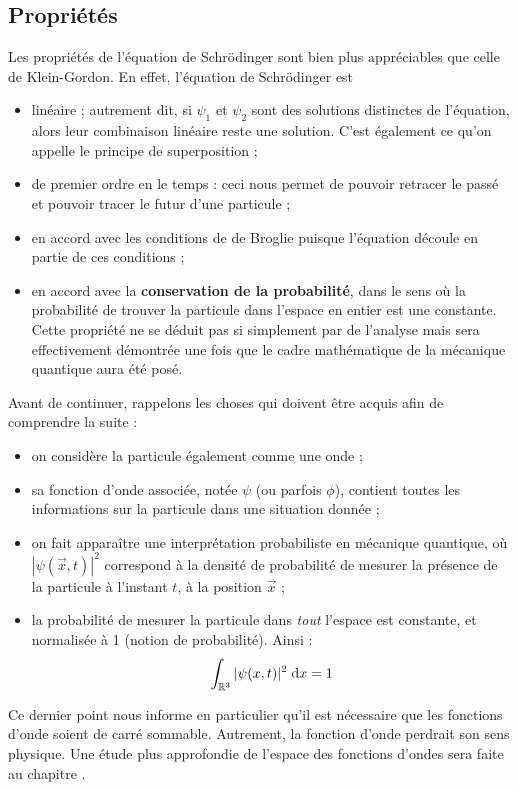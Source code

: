 \documentclass[12pt, a4paper]{book}
\begin{document}
\subsection{Propriétés}
Les propriétés de l'équation de Schrödinger sont bien plus appréciables que celle de Klein-Gordon. En effet, l'équation de Schrödinger est
\begin{itemize}
\item linéaire ; autrement dit, si $\psi_1$ et $\psi_2$ sont des solutions distinctes de l'équation, alors leur combinaison linéaire reste une solution. C'est également ce qu'on appelle le principe de superposition ; 
\item de premier ordre en le temps : ceci nous permet de pouvoir retracer le passé et pouvoir tracer le futur d'une particule {\color{blue}{je comprends pas trop la justification. Et puis pour qlq'un en BA2, est-ce qu'on voit vrmt ce qu'on veut dire par là? Si ça ne tenait qu'à moi, j'enlèverai cette phrase}};
\item en accord avec les conditions de de Broglie puisque l'équation découle en partie de ces conditions ;
\item en accord avec la \textbf{conservation de la probabilité}, dans le sens où la probabilité de trouver la particule dans l'espace en entier est une constante. Cette propriété ne se déduit pas si simplement par de l'analyse mais sera effectivement démontrée une fois que le cadre mathématique de la mécanique quantique aura été posé.
\end{itemize}
Avant de continuer, rappelons les choses qui doivent être acquis afin de comprendre la suite : 
\begin{itemize}[label= \textbullet]
  \item on considère la particule également comme une onde ; 
  \item sa fonction d'onde associée, notée $\psi$ (ou parfois $\phi$), contient toutes les informations sur la particule dans une situation donnée ; 
  \item on fait apparaître une interprétation probabiliste en mécanique quantique, où $|\psi(\vec{x},t)|^2$ correspond à la densité de probabilité de mesurer la présence de la particule à l'instant $t$, à la position $\vec{x}$ ; 
  \item la probabilité de mesurer la particule dans \textit{tout} l'espace est constante, et normalisée à 1 (notion de probabilité). Ainsi : 
  \begin{equation}
    \int_{\mathbb{R}^3} |\psi(x,t)|^2 \; \mathrm{d}x = 1
  \end{equation}
\end{itemize}
Ce dernier point nous informe en particulier qu'il est nécessaire que les fonctions d'onde soient de carré sommable. Autrement, la fonction d'onde perdrait son sens physique. 
Une étude plus approfondie de l'espace des fonctions d'ondes sera faite au chapitre .
\end{document}
